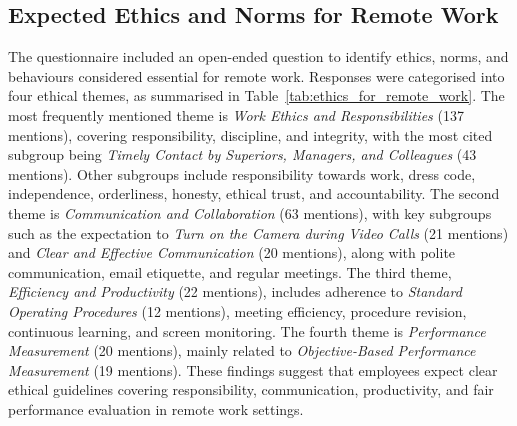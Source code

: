 \documentclass[a4paper, conference]{IEEEtran}
\begin{document}
\subsection{Expected Ethics and Norms for Remote Work}
\label{sec:ethics-remote-work}

The questionnaire included an open-ended question to identify ethics, norms, and behaviours considered essential for remote work. Responses were categorised into four ethical themes, as summarised in Table~\ref{tab:ethics_for_remote_work}. The most frequently mentioned theme is \textit{Work Ethics and Responsibilities} (137 mentions), covering responsibility, discipline, and integrity, with the most cited subgroup being \textit{Timely Contact by Superiors, Managers, and Colleagues} (43 mentions). Other subgroups include responsibility towards work, dress code, independence, orderliness, honesty, ethical trust, and accountability. The second theme is \textit{Communication and Collaboration} (63 mentions), with key subgroups such as the expectation to \textit{Turn on the Camera during Video Calls} (21 mentions) and \textit{Clear and Effective Communication} (20 mentions), along with polite communication, email etiquette, and regular meetings. The third theme, \textit{Efficiency and Productivity} (22 mentions), includes adherence to \textit{Standard Operating Procedures} (12 mentions), meeting efficiency, procedure revision, continuous learning, and screen monitoring. The fourth theme is \textit{Performance Measurement} (20 mentions), mainly related to \textit{Objective-Based Performance Measurement} (19 mentions). These findings suggest that employees expect clear ethical guidelines covering responsibility, communication, productivity, and fair performance evaluation in remote work settings.
\end{document}
